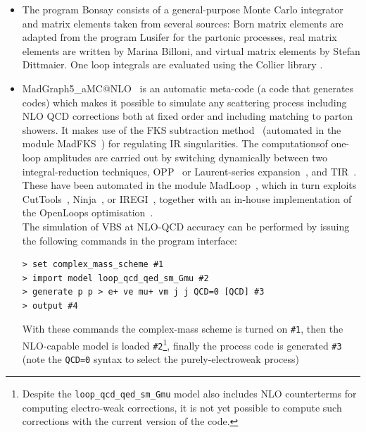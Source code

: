 \begin{itemize}
 \item The program {\sc Bonsay} consists of a general-purpose Monte Carlo integrator
and matrix elements taken from several sources: Born matrix elements are
adapted from the program {\sc Lusifer} \cite{Dittmaier:2002ap} for the partonic
processes, real matrix elements are written by Marina Billoni, and virtual
matrix elements by Stefan Dittmaier.
One loop integrals are evaluated using the {\sc Collier} library
\cite{Denner:2014gla,Denner:2016kdg}.

  \item {\sc MadGraph5\_aMC@NLO}~\cite{Alwall:2014hca} is an automatic meta-code (a code that generates codes) which makes it possible to simulate any scattering process
      including NLO QCD corrections both at fixed order and including matching to parton showers. It makes use of the FKS subtraction method~\cite{Frixione:1995ms,
        Frixione:1997np} (automated in the module {\sc MadFKS}~\cite{Frederix:2009yq,
        Frederix:2016rdc}) for regulating IR singularities. The computationsof one-loop amplitudes are carried out by switching dynamically between 
        two integral-reduction techniques, OPP~\cite{Ossola:2006us} or Laurent-series expansion~\cite{Mastrolia:2012bu},
        and TIR~\cite{Passarino:1978jh,Davydychev:1991va,Denner:2005nn}. These have been automated in the module {\sc MadLoop}~\cite{Hirschi:2011pa}, which 
        in turn exploits {\sc CutTools}~\cite{Ossola:2007ax}, {\sc Ninja}~\cite{Peraro:2014cba,
        Hirschi:2016mdz}, or {\sc IREGI}~\cite{ShaoIREGI}, together with an in-house implementation of the {\sc OpenLoops} optimisation~\cite{Cascioli:2011va}.\\
        The simulation of VBS at NLO-QCD accuracy can be performed by issuing the following commands in the program interface:
\begin{verbatim}
> set complex_mass_scheme #1
> import model loop_qcd_qed_sm_Gmu #2
> generate p p > e+ ve mu+ vm j j QCD=0 [QCD] #3
> output #4
\end{verbatim}
  With these commands the complex-mass scheme is turned on {\tt \#1}, then the NLO-capable model is loaded {\tt \#2}\footnote{Despite
            the {\tt loop\_qcd\_qed\_sm\_Gmu} model also includes NLO counterterms for computing electro-weak corrections, it is not yet possible to compute such corrections 
        with the current version of the code.}, finally the process code is generated {\tt \#3} (note the {\tt QCD=0} syntax to select the purely-electroweak process)

\end{itemize}

